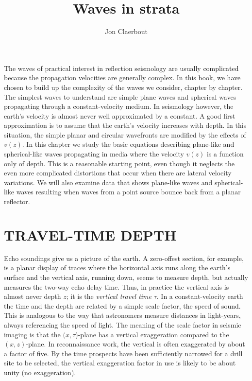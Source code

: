 \def\CAKEDIR{.}

\title{Waves in strata}
\author{Jon Claerbout}
\label{paper:wvs}
\maketitle

\def\RMS{{{\sc rms}}}   %

\def\RMS{{\rm RMS}}     %

The waves of practical interest in reflection seismology are usually complicated
because the propagation velocities are generally complex.
In this book, we have chosen to build up the complexity of the waves we
consider, chapter by chapter.  The simplest waves to understand are simple
plane waves and spherical waves propagating through a constant-velocity medium.
In seismology however, the earth's velocity is almost never well approximated
by a constant.
A good first approximation is to assume that the earth's 
velocity increases with depth.
In this situation, the simple planar and circular wavefronts 
are modified by the effects of $v(z)$.
In this chapter we study the basic equations describing plane-like 
and spherical-like waves propagating 
in media where the velocity $v(z)$ is a function only of depth.
This is a reasonable starting point,
even though it neglects the even more complicated distortions that occur
when there are lateral velocity variations.
We will also examine data that shows plane-like waves
and spherical-like waves resulting when waves
from a point source bounce back from a planar reflector.

\section{TRAVEL-TIME DEPTH}
\par
Echo soundings give us a picture of the earth.
A zero-offest section, for example,
is a planar display of traces where the horizontal axis runs along 
the earth's surface
and the vertical axis, running down, seems to measure depth,
but actually measures the two-way echo delay time.
Thus, in practice the vertical axis is almost never depth $z$;
it is the
{\em 
vertical travel time
}
$ \tau $.
In a constant-velocity earth
the time and the depth are related
by a simple scale factor, the speed of sound.  This is analogous to the
way that astronomers measure distances in light-years, always referencing
the speed of light.
The meaning of the scale factor in seismic imaging 
is that the  $(x, \tau$)-plane
has a vertical exaggeration compared to the  $(x,z)$-plane.
In reconnaissance work,
the vertical is often exaggerated by about a factor of five.
By the time prospects have been sufficiently narrowed for a drill
site to be selected,
the vertical exaggeration factor in use is likely to be about unity
(no exaggeration).

